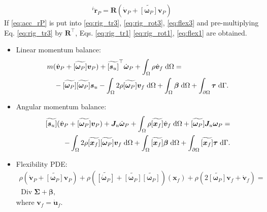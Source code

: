 \documentclass{svjour3}                     %
\DeclareMathOperator*{\Div}{Div}
\newcommand{\crmat}[1]{\ensuremath{\widetilde{\left[#1\right]}}}
\begin{document}
\begin{equation}
\label{eq:acc_rP}
^{i}\ddot{\bm{r}}_P = \bm{R} \left(\dot{\bm{v}}_P + \crmat{\bm{\omega}_P} \bm{v}_P \right)
\end{equation}
If \eqref{eq:acc_rP} is put into \eqref{eq:rig_tr3}, \eqref{eq:rig_rot3}, \eqref{eq:flex3} and pre-multiplying  Eq. \eqref{eq:rig_tr3} by $\bm{R}^\top$, Eqs. \eqref{eq:rig_tr1} \eqref{eq:rig_rot1}, \eqref{eq:flex1} are obtained.
\begin{itemize}
\item Linear momentum balance:
\begin{equation}
\label{eq:rig_tr4}
\begin{split}
&m (\dot{\bm{v}}_P + \crmat{\bm{\omega}_P} \bm{v}_P) + \crmat{\bm{s}_u}^\top \dot{\bm{\omega}}_P  + \int_{\Omega} \rho \dot{\bm{v}}_f \d{\Omega} = \\
&\quad - \crmat{\bm{\omega}_P} \crmat{\bm{\omega}_P} \bm{s}_u - \int_{\Omega} 2 \rho \crmat{\bm{\omega}_P} {\bm{v}}_f \d{\Omega} +  \int_{\Omega} \bm\beta \d{\Omega} + \int_{\partial \Omega} \bm\tau \d{\Gamma}.
\end{split}
\end{equation}
\item Angular momentum balance:
\begin{equation}
\label{eq:rig_rot4}
\begin{split}
\crmat{\bm{s}_u} (\dot{\bm{v}}_P + \crmat{\bm{\omega}_P} \bm{v}_P) + \bm{J}_u \dot{\bm\omega}_P + \int_{\Omega} \rho \crmat{\bm{x}_f} \dot{\bm{v}}_f \d{\Omega} + \crmat{\bm{\omega}_P} \bm{J}_u \bm{\omega}_P = \\ 
- \int_{\Omega} 2\rho \crmat{\bm{x}_f} \crmat{\bm\omega_P} {\bm{v}}_f \d{\Omega} + \int_{\Omega}\crmat{\bm{x}_f} \bm\beta \d{\Omega} + \int_{\partial \Omega}\crmat{\bm{x}_f} \bm\tau \d{\Gamma}. \\
\end{split}
\end{equation}
\item Flexibility PDE:
\begin{equation}
\label{eq:flex4}
\begin{split}
\rho (\dot{\bm{v}}_P + \crmat{\bm\omega_P} \bm{v}_P) + \rho (\crmat{\dot{\bm\omega}_P} + \crmat{\bm{\omega}_P}\crmat{\bm{\omega}_P})(\bm{x}_f) + \rho (2 \crmat{\bm{\omega}_P} {\bm{v}}_f + \dot{\bm{v}}_f) = \\
\Div{\bm\Sigma} + \bm\beta,
\end{split}
\end{equation}
where $\bm{v}_f = \dot{\bm{u}}_f$.
\end{itemize}
\end{document}
